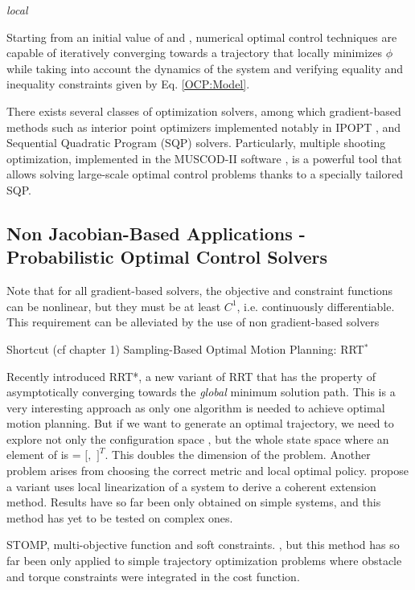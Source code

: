 \emph{local}

Starting from an initial value of \state{} and \control{}, numerical
optimal control techniques are capable of iteratively converging
towards a trajectory that locally minimizes $\phi$ while taking into
account the dynamics of the system and verifying equality and
inequality constraints given by Eq. \ref{OCP:Model}.

There exists several classes of optimization solvers, among which
gradient-based methods such as interior point optimizers implemented
notably in IPOPT \cite{Biegler2009}, and Sequential Quadratic Program
(SQP) solvers. Particularly, multiple shooting optimization,
implemented in the \textsc{MUSCOD-II} software \cite{Leineweber2003},
is a powerful tool that allows solving large-scale optimal control
problems thanks to a specially tailored SQP.

\subsection{Non Jacobian-Based Applications - Probabilistic Optimal Control Solvers}

Note that for all gradient-based solvers, the objective and constraint
functions can be nonlinear, but they must be at least $C^1$,
i.e. continuously differentiable. This requirement can be alleviated
by the use of non gradient-based solvers

Shortcut (cf chapter 1)
Sampling-Based Optimal Motion Planning: RRT$^*$

Recently \cite{Karaman2011} introduced RRT*, a new variant of RRT that
has the property of asymptotically converging towards the \emph{global}
minimum solution path. This is a very interesting approach as only one
algorithm is needed to achieve optimal motion planning. But if we want
to generate an optimal trajectory, we need to explore not only the
configuration space \cspace, but the whole state space
\sspace\thinspace where an element of \sspace\enspace is \state{} =
$[$\config{}$,$ \dotconfig{}$]^T$. This doubles the dimension of the
problem. Another problem arises from choosing the correct metric and
local optimal policy. \cite{Perez2012} propose a variant uses local
linearization of a system to derive a coherent extension
method. Results have so far been only obtained on simple systems, and
this method has yet to be tested on complex ones.

STOMP, multi-objective function and soft constraints.
\cite{Kalakrishnan2011}, but this method has so far been only applied
to simple trajectory optimization problems where obstacle and torque
constraints were integrated in the cost function. 

